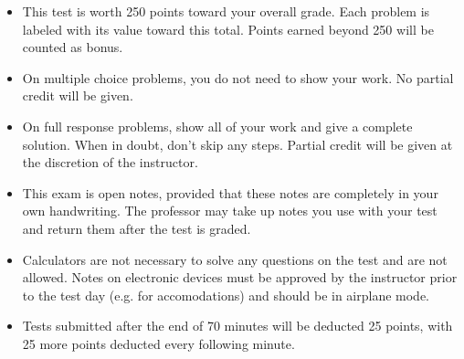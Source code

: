 \documentclass[12pt]{exam}
\newcommand{\<}{\langle}
\renewcommand{\>}{\rangle}
\begin{document}
\begin{center}
\end{center}
\vspace{0.1in}

\vspace{12pt}

\begin{itemize}
  \item This test is worth 250 points toward your overall grade.
        Each problem is labeled with its value toward this total. Points
        earned beyond 250 will be counted as bonus.
  \item On multiple choice problems, you do not need to show your work. No
        partial credit will be given.
  \item On full response problems, show all of your work and give a
        complete solution. When in doubt, don't skip any steps. Partial
        credit will be given at the discretion of the instructor.
  \item This exam is open notes, provided that these notes are completely
        in your own handwriting. The professor may take up notes you use
        with your test and return them after the test is graded.
  \item Calculators are not necessary to solve any questions on the test and
        are not allowed.
        Notes on electronic devices must be approved by the instructor
        prior to the test day (e.g. for accomodations) and should be in
        airplane mode.
  \item Tests submitted after the end of 70 minutes will be deducted 25 points,
        with 25 more points deducted every following minute.
\end{itemize}

\newpage
\end{document}
